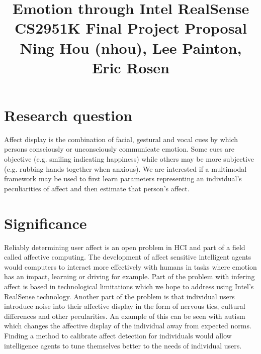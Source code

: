 \documentclass[12pt,letterpaper]{article}
\begin{document}
\title{Emotion through Intel RealSense\\ \vspace{2 mm} {\large CS2951K Final Project Proposal}\\ {\large Ning Hou (nhou), Lee Painton, Eric Rosen}}

\maketitle

\section{Research question}
Affect display is the combination of facial, gestural and vocal cues by which persons consciously or unconsciously communicate emotion.  Some cues are objective (e.g. smiling indicating happiness) while others may be more subjective (e.g. rubbing hands together when anxious).  We are interested if a multimodal framework may be used to first learn parameters representing an individual's peculiarities of affect and then estimate that person's affect.

\section{Significance}
Reliably determining user affect is an open problem in HCI and part of a field called affective computing.  The development of affect sensitive intelligent agents would computers to interact more effectively with humans in tasks where emotion has an impact, learning or driving for example.  Part of the problem with infering affect is based in technological limitations which we hope to address using Intel's RealSense technology.  Another part of the problem is that individual users introduce noise into their affective display in the form of nervous tics, cultural differences and other pecularities.  An example of this can be seen with autism which changes the affective display of the individual away from expected norms.  Finding a method to calibrate affect detection for individuals would allow intelligence agents to tune themselves better to the needs of individual users.

\end{document}
